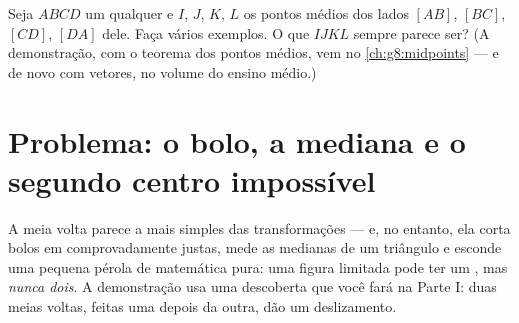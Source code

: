 \begin{exercise}[$\star\star\star$]\label{exo:g7:central:11}
Seja $ABCD$ um  qualquer e $I$, $J$, $K$, $L$ os pontos
médios dos lados $[AB]$, $[BC]$, $[CD]$, $[DA]$ dele. Faça vários
exemplos. O que $IJKL$ sempre parece ser? (A demonstração, com o
teorema dos pontos médios, vem no \cref{ch:g8:midpoints} --- e de novo
com vetores, no volume do ensino médio.)
\end{exercise}

\section{Problema: o bolo, a mediana e o segundo centro impossível}

\begin{problem}
\label{pb:g7:central:1}
A meia volta parece a mais simples das transformações --- e, no
entanto, ela corta bolos em  comprovadamente justas, mede as
medianas de um triângulo e esconde uma pequena pérola de matemática
pura: uma figura limitada pode ter um , mas
\emph{nunca dois}. A demonstração usa uma descoberta que você fará na
Parte I: duas meias voltas, feitas uma depois da outra, dão um
deslizamento.


\end{problem}
